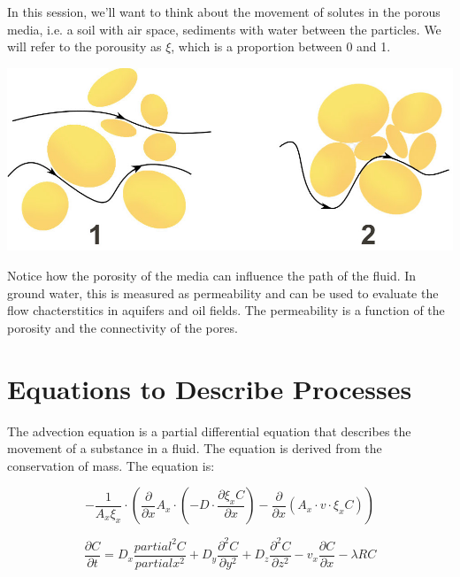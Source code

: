 \documentclass{tufte-handout}\usepackage[]{graphicx}\usepackage[]{xcolor}
\begin{document}
In this session, we'll want to think about the movement of solutes in the porous media, i.e. a soil with air space, sediments with water between the particles. We will refer to the porousity as $\xi$, which is a proportion between 0 and 1. 

\begin{marginfigure}
\centering
\includegraphics{graphics/Darcy_permeability.jpg}
\caption{Notice how the porosity of the media can influence the path of the fluid. In ground water, this is measured as permeability and can be used to evaluate the flow chacterstitics in aquifers and oil fields. The permeability is a function of the porosity and the connectivity of the pores.}
\end{marginfigure}


\section{Equations to Describe Processes}


The advection equation is a partial differential equation that describes the movement of a substance in a fluid. The equation is derived from the conservation of mass. The equation is:


\begin{equation}
- \frac{1}{A_x \xi_x} \cdot \left( \frac{\partial}{\partial x} A_x \cdot \left( -D \cdot \frac{\partial \xi_x C}{\partial x} \right) - \frac{\partial}{\partial x} \left( A_x \cdot v \cdot \xi_x C \right) \right)
\end{equation}

\begin{equation}
\frac{\partial C}{\partial t} = D_x \frac{partial^2 C}{partial x^2} +
D_y \frac{\partial^2 C}{\partial y^2} +
D_z \frac{\partial^2 C}{\partial z^2} -
v_x \frac{\partial C}{\partial x} -
\lambda RC
\end{equation}
\end{document}
